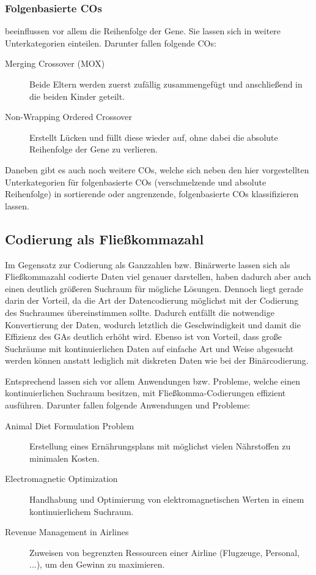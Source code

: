 	\subsubsection{Folgenbasierte COs}
	
		beeinflussen vor allem die Reihenfolge der Gene. Sie lassen sich in weitere Unterkategorien einteilen. Darunter fallen \zB folgende COs:
		
		\begin{description}
			\item[Merging Crossover (MOX)] Beide Eltern werden zuerst zufällig zu\-sam\-men\-ge\-fügt und anschließend in die beiden Kinder geteilt. \cite{OrderBasedForGCP}
			\item[Non-Wrapping Ordered Crossover] Erstellt Lücken und füllt diese wieder auf, ohne dabei die absolute Reihenfolge der Gene zu verlieren. \cite{GAforTSP}
		\end{description}
	
		Daneben gibt es auch noch weitere COs, welche sich neben den hier vorgestellten Unterkategorien für folgenbasierte COs (verschmelzende und absolute Reihenfolge) in \zB  sor\-tier\-ende oder angrenzende, folgenbasierte COs klassifizieren lassen.


\subsection{Codierung als Fließkommazahl}
\label{sec:FloatCod}

	Im Gegensatz zur Codierung als Ganzzahlen bzw. Binärwerte lassen sich  als Fließkommazahl codierte Daten viel genauer darstellen, haben da\-durch aber auch einen deutlich größeren Suchraum für mögliche Lösungen. Dennoch liegt gerade darin der Vorteil, da die Art der Datencodierung möglichst mit der Codierung des Suchraumes übereinstimmen sollte. Dadurch entfällt die not\-wen\-dige Konvertierung der Daten, wodurch letztlich die Geschwindigkeit und damit die Effizienz des GAs deutlich erhöht wird. Ebenso ist von Vorteil, dass große Suchräume mit kontinuierlichen Daten auf einfache Art und Weise abgesucht werden können anstatt lediglich mit diskreten Daten wie bei der Binärcodierung. \cite{TacklingRealCodedGA}
	
	Entsprechend lassen sich vor allem Anwendungen bzw. Probleme, welche einen kontinuierlichen Suchraum besitzen, mit Fließkomma-Codierungen effizient ausführen. Darunter fallen \zB folgende Anwendungen und Probleme:
	
	\begin{description}
		\item[Animal Diet Formulation Problem] Erstellung eines Ernährungsplans mit möglichst vielen Nährstoffen zu minimalen Kosten. \cite{ConceptOfCOInRealCoded}
		\item[Electromagnetic Optimization] Handhabung und Optimierung von elektromagnetischen Werten in einem kontinuierlichem Suchraum. \cite{ElectromagneticRealEncoding}
		\item[Revenue Management in Airlines] Zuweisen von begrenzten Ressourcen ei\-ner Airline (Flugzeuge, Personal, ...), um den Gewinn zu maximieren. \cite{AirlineRevenueManagement}
	\end{description}
	

